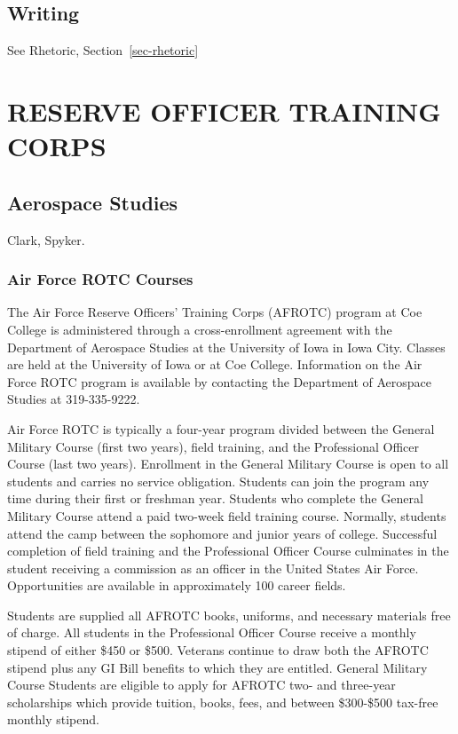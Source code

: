 \documentclass[
  letterpaper,
]{scrbook}
\begin{document}
\section{Writing}\label{sec-writing}

See Rhetoric, Section~\ref{sec-rhetoric}

\chapter{RESERVE OFFICER TRAINING
CORPS}\label{reserve-officer-training-corps}

\section{Aerospace Studies}\label{aerospace-studies}

Clark, Spyker.

\subsection{Air Force ROTC Courses}\label{air-force-rotc-courses}

The Air Force Reserve Officers' Training Corps (AFROTC) program at Coe
College is administered through a cross-enrollment agreement with the
Department of Aerospace Studies at the University of Iowa in Iowa City.
Classes are held at the University of Iowa or at Coe College.
Information on the Air Force ROTC program is available by contacting the
Department of Aerospace Studies at 319-335-9222.

Air Force ROTC is typically a four-year program divided between the
General Military Course (first two years), field training, and the
Professional Officer Course (last two years). Enrollment in the General
Military Course is open to all students and carries no service
obligation. Students can join the program any time during their first or
freshman year. Students who complete the General Military Course attend
a paid two-week field training course. Normally, students attend the
camp between the sophomore and junior years of college. Successful
completion of field training and the Professional Officer Course
culminates in the student receiving a commission as an officer in the
United States Air Force. Opportunities are available in approximately
100 career fields.

Students are supplied all AFROTC books, uniforms, and necessary
materials free of charge. All students in the Professional Officer
Course receive a monthly stipend of either \$450 or \$500. Veterans
continue to draw both the AFROTC stipend plus any GI Bill benefits to
which they are entitled. General Military Course Students are eligible
to apply for AFROTC two- and three-year scholarships which provide
tuition, books, fees, and between \$300-\$500 tax-free monthly stipend.
\end{document}
